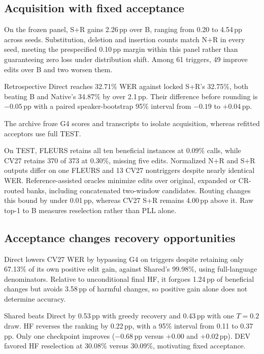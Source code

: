 \subsection{Acquisition with fixed acceptance}

On the frozen panel, S+R gains 2.26\,pp over B, ranging from 0.20 to 4.54\,pp across seeds. Substitution, deletion and insertion counts match N+R in every seed, meeting the prespecified 0.10\,pp margin within this panel rather than guaranteeing zero loss under distribution shift. Among 61 triggers, 49 improve edits over B and two worsen them.

\begin{samepage}
Retrospective Direct reaches 32.71\% WER against locked S+R's 32.75\%, both beating B and Native's 34.87\% by over 2.1\,pp. Their difference before rounding is $-0.05$\,pp with a paired speaker-bootstrap 95\% interval from $-0.19$ to $+0.04$\,pp.\par
\end{samepage}
The archive froze G4 scores and transcripts to isolate acquisition, whereas refitted acceptors use full TEST.

On TEST, FLEURS retains all ten beneficial instances at 0.09\% calls, while CV27 retains 370 of 373 at 0.30\%, missing five edits. Normalized N+R and S+R outputs differ on one FLEURS and 13 CV27 nontriggers despite nearly identical WER. Reference-assisted oracles minimize edits over original, expanded or CR-routed banks, including concatenated two-window candidates. Routing changes this bound by under 0.01\,pp, whereas CV27 S+R remains 4.00\,pp above it. Raw top-1 to B measures reselection rather than PLL alone.

\subsection{Acceptance changes recovery opportunities}
Direct lowers CV27 WER by bypassing G4 on triggers despite retaining only 67.13\% of its own positive edit gain, against Shared's 99.98\%, using full-language denominators. Relative to unconditional final HF, it forgoes 1.24\,pp of beneficial changes but avoids 3.58\,pp of harmful changes, so positive gain alone does not determine accuracy.

Shared beats Direct by 0.53\,pp with greedy recovery and 0.43\,pp with one $T=0.2$ draw. HF reverses the ranking by 0.22\,pp, with a 95\% interval from 0.11 to 0.37\,pp. Only one checkpoint improves ($-0.68$\,pp versus $+0.00$ and $+0.02$\,pp). DEV favored HF reselection at 30.08\% versus 30.09\%, motivating fixed acceptance.

